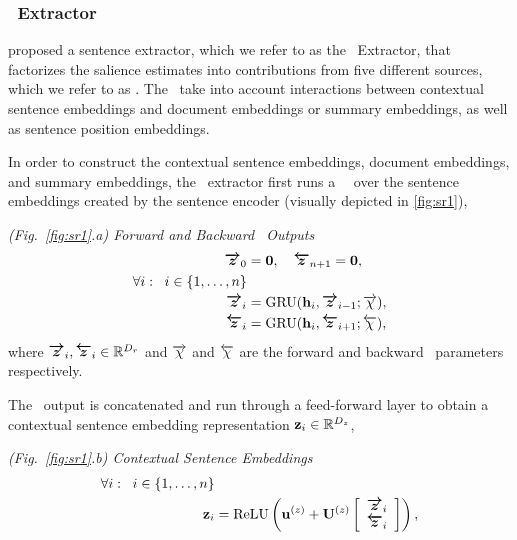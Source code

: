 
\subsubsection{\srext~Extractor}

\citet{nallapati2017summarunner} proposed
a sentence extractor, which we refer to as the \srext~Extractor,
that factorizes the salience estimates into contributions 
from five different sources, which we refer to as \saliencefactors.
The \saliencefactors~take into account interactions between 
contextual sentence embeddings and document embeddings or summary embeddings,
as well as sentence position embeddings.

In order to construct the contextual sentence embeddings, document 
embeddings, and summary embeddings, the \srext~extractor first runs 
a \bidirectional~\gru~over the sentence 
embeddings created by the sentence encoder (visually depicted in \autoref{fig:sr1}), 



%

\noindent \textit{(Fig.~\ref{fig:sr1}.a) Forward and Backward \gru~Outputs}
\begin{align}
    \boldsymbol{\overrightarrow{z}}_0 &= \mathbf{0}, \quad \boldsymbol{\overleftarrow{z}}_{n + 1} = \mathbf{0}, \\
    \forall i : \;\; i \in \{1,\ldots,n\}&\nonumber \\
    \boldsymbol{\overrightarrow{z}}_i &= \operatorname{GRU}(\mathbf{h}_i, \boldsymbol{\overrightarrow{z}}_{i-1}; \overrightarrow{\chi}), \\
    \boldsymbol{\overleftarrow{z}}_i &= \operatorname{GRU}(\mathbf{h}_i, \boldsymbol{\overleftarrow{z}}_{i+1}; \overleftarrow{\chi}),
\end{align}
where $\boldsymbol{\overrightarrow{z}}_i,\boldsymbol{\overleftarrow{z}}_i \in \mathbb{R}^{{D_r}}$ and $\overrightarrow{\chi}$ and $\overleftarrow{\chi}$ are the forward and backward \gru~parameters respectively.



    The \gru~output is
concatenated and run through a feed-forward layer to obtain 
a contextual sentence embedding representation $\mathbf{z}_i \in \mathbb{R}^{{D_z}}$, 


\vspace{10pt}
\noindent \textit{(Fig.~\ref{fig:sr1}.b) Contextual Sentence Embeddings} 
\begin{align}
    \forall i : \;\; i \in \{1,\ldots,n\}&\nonumber \\
\mathbf{z}_i  & = \operatorname{ReLU}\left(\mathbf{u}^{(z)} + \mathbf{U}^{(z)} \left[ \begin{array}{c} \boldsymbol{\overrightarrow{z}}_i \\ \boldsymbol{\overleftarrow{z}}_i  \end{array} \right]  \right),
\end{align}

